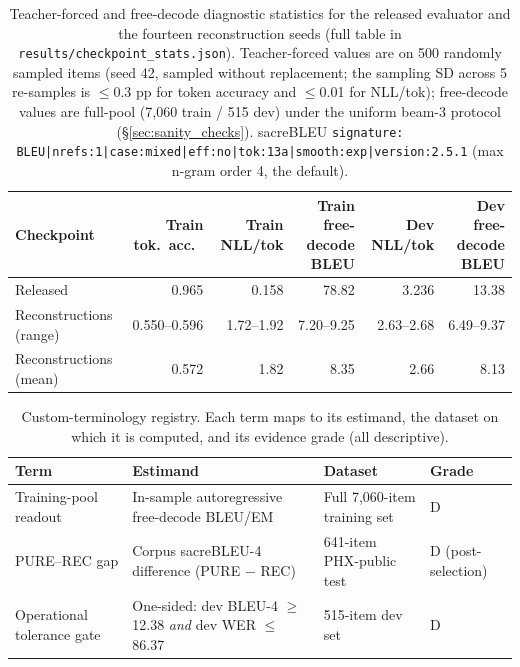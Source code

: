 \documentclass[pdflatex,sn-chicago]{sn-jnl}
\begin{document}
\begin{table}[h]
\centering
\scriptsize\setlength{\tabcolsep}{2pt}
\caption{Teacher-forced and free-decode diagnostic statistics for the released evaluator and the fourteen reconstruction seeds (full table in \texttt{results/checkpoint\_stats.json}). Teacher-forced values are on 500 randomly sampled items (seed 42, sampled without replacement; the sampling SD across 5 re-samples is $\leq$0.3 pp for token accuracy and $\leq$0.01 for NLL/tok); free-decode values are full-pool (7{,}060 train / 515 dev) under the uniform beam-3 protocol (\S\ref{sec:sanity_checks}). sacreBLEU \texttt{signature: BLEU|nrefs:1|case:mixed|eff:no|tok:13a|smooth:exp|version:2.5.1} (max n-gram order 4, the default).}
\label{tab:sanity_stats}
\begin{tabular}{lrrrrr}
\toprule
Checkpoint & Train tok.\ acc.\ & Train NLL/tok & Train free-decode BLEU & Dev NLL/tok & Dev free-decode BLEU \\
\midrule
Released & 0.965 & 0.158 & 78.82 & 3.236 & 13.38 \\
Reconstructions (range) & 0.550--0.596 & 1.72--1.92 & 7.20--9.25 & 2.63--2.68 & 6.49--9.37 \\
Reconstructions (mean) & 0.572 & 1.82 & 8.35 & 2.66 & 8.13 \\
\bottomrule
\end{tabular}
\end{table}

\begin{table}[h]
\centering
\scriptsize\setlength{\tabcolsep}{3pt}
\caption{Custom-terminology registry. Each term maps to its estimand, the dataset on which it is computed, and its evidence grade (all descriptive).}
\label{tab:terminology}
\begin{tabular}{p{3.0cm}p{4.0cm}p{3.5cm}p{1.5cm}}
\toprule
Term & Estimand & Dataset & Grade \\
\midrule
Training-pool readout & In-sample autoregressive free-decode BLEU/EM & Full 7{,}060-item training set & D \\
PURE--REC gap & Corpus sacreBLEU-4 difference (PURE $-$ REC) & 641-item PHX-public test & D (post-selection) \\
Operational tolerance gate & One-sided: dev BLEU-4 $\geq$ 12.38 \emph{and} dev WER $\leq$ 86.37 & 515-item dev set & D \\
\bottomrule
\end{tabular}
\end{table}
\end{document}
